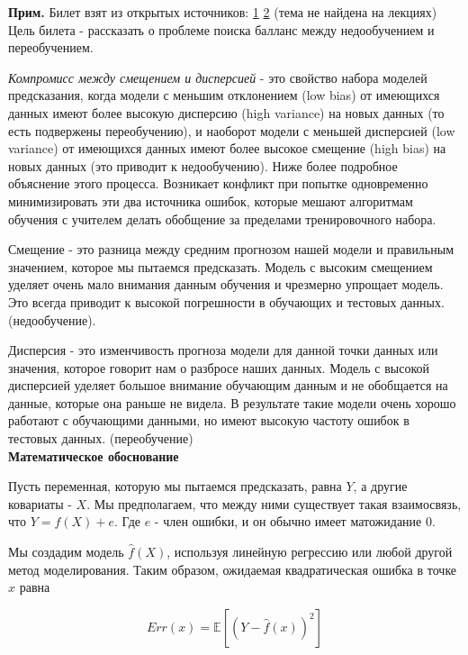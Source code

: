 \textbf{Прим.} Билет взят из открытых источников: \href{https://towardsdatascience.com/understanding-the-bias-variance-tradeoff-165e6942b229}{1} \href{https://en.wikipedia.org/wiki/Bias%E2%80%93variance_tradeoff#:~:text=The%20bias%E2%80%93variance%20decomposition%20is,noise%20in%20the%20problem%20itself.}{2} (тема не найдена на лекциях)
\\

Цель билета - рассказать о проблеме поиска балланс между недообучением и переобучением.

\textit{Компромисс между смещением и дисперсией} - это свойство набора моделей предсказания, когда модели с меньшим отклонением (low bias) от имеющихся данных имеют более высокую дисперсию (high variance) на новых данных (то есть подвержены переобучению), и наоборот модели с меньшей дисперсией (low variance) от имеющихся данных имеют более высокое смещение (high bias) на новых данных (это приводит к недообучению). Ниже более подробное объяснение этого процесса. Возникает конфликт при попытке одновременно минимизировать эти два источника ошибок, которые мешают алгоритмам обучения с учителем делать обобщение за пределами тренировочного набора.

Смещение - это разница между средним прогнозом нашей модели и правильным значением, которое мы пытаемся предсказать. Модель с высоким смещением уделяет очень мало внимания данным обучения и чрезмерно упрощает модель. Это всегда приводит к высокой погрешности в обучающих и тестовых данных. (недообучение).

Дисперсия - это изменчивость прогноза модели для данной точки данных или значения, которое говорит нам о разбросе наших данных. Модель с высокой дисперсией уделяет большое внимание обучающим данным и не обобщается на данные, которые она раньше не видела. В результате такие модели очень хорошо работают с обучающими данными, но имеют высокую частоту ошибок в тестовых данных. (переобучение)
\\
\textbf{Математическое обоснование}

Пусть переменная, которую мы пытаемся предсказать, равна $Y$, а другие ковариаты - $X$. Мы предполагаем, что между ними существует такая взаимосвязь, что
$Y=f(X) + e$. Где $e$ - член ошибки, и он обычно имеет матожидание 0.

Мы создадим модель $\hat{f}(X)$, используя линейную регрессию или любой другой метод моделирования.
Таким образом, ожидаемая квадратическая ошибка в точке $x$ равна

$$Err(x) = \mathbb{E}[(Y - \hat{f}(x))^2]$$

